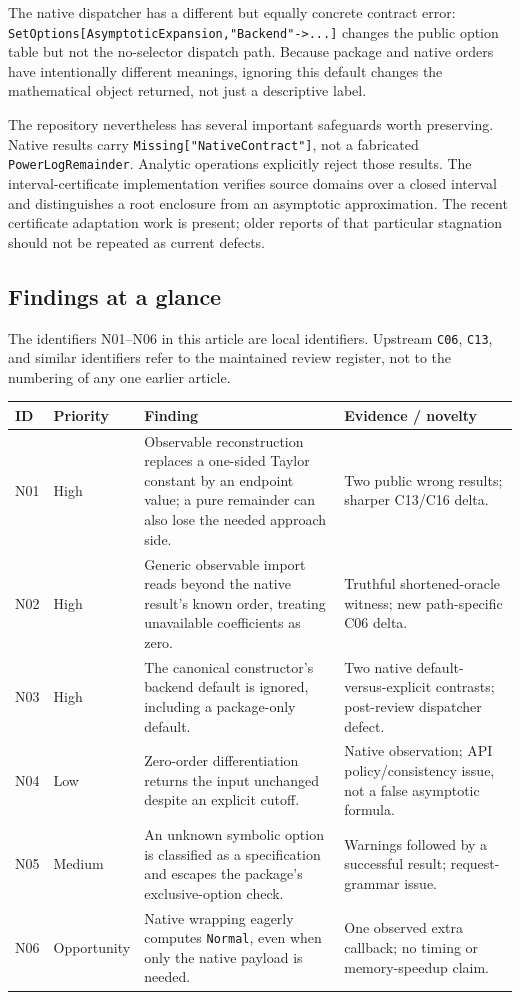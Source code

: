 \documentclass[11pt,letterpaper]{article}
\newcommand{\code}[1]{\nolinkurl{#1}}
\begin{document}
The native dispatcher has a different but equally concrete contract error:
\code{SetOptions[AsymptoticExpansion,"Backend"->...]} changes the public option
table but not the no-selector dispatch path. Because package and native orders
have intentionally different meanings, ignoring this default changes the
mathematical object returned, not just a descriptive label.~\cite{compatibility}

The repository nevertheless has several important safeguards worth preserving.
Native results carry \code{Missing["NativeContract"]}, not a fabricated
\code{PowerLogRemainder}. Analytic operations explicitly reject those results.
The interval-certificate implementation verifies source domains over a closed
interval and distinguishes a root enclosure from an asymptotic approximation.
The recent certificate adaptation work is present; older reports of that
particular stagnation should not be repeated as current defects.~\cite{nativecontracts,certificates,register}

\subsection{Findings at a glance}
The identifiers N01--N06 in this article are local identifiers. Upstream
\code{C06}, \code{C13}, and similar identifiers refer to the maintained review
register, not to the numbering of any one earlier article.

\begin{longtable}{@{}P{0.065\textwidth}P{0.135\textwidth}P{0.47\textwidth}P{0.25\textwidth}@{}}
\toprule
ID & Priority & Finding & Evidence / novelty\\\midrule\endhead
N01 & High & Observable reconstruction replaces a one-sided Taylor constant by an endpoint value; a pure remainder can also lose the needed approach side. & Two public wrong results; sharper C13/C16 delta.\\
N02 & High & Generic observable import reads beyond the native result's known order, treating unavailable coefficients as zero. & Truthful shortened-oracle witness; new path-specific C06 delta.\\
N03 & High & The canonical constructor's backend default is ignored, including a package-only default. & Two native default-versus-explicit contrasts; post-review dispatcher defect.\\
N04 & Low & Zero-order differentiation returns the input unchanged despite an explicit cutoff. & Native observation; API policy/consistency issue, not a false asymptotic formula.\\
N05 & Medium & An unknown symbolic option is classified as a specification and escapes the package's exclusive-option check. & Warnings followed by a successful result; request-grammar issue.\\
N06 & Opportunity & Native wrapping eagerly computes \code{Normal}, even when only the native payload is needed. & One observed extra callback; no timing or memory-speedup claim.\\
\bottomrule
\end{longtable}
\end{document}
